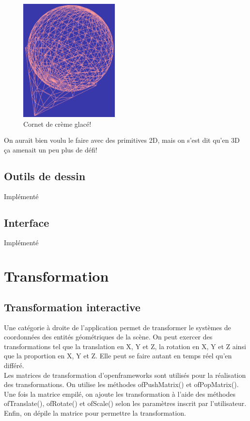 \begin{figure}[h]
	\centering
	\includegraphics[width=5cm]{fig/iceCream.png}
	\caption{Cornet de crème glacé!}
	\label{fig:iceCream}
\end{figure}

On aurait bien voulu le faire avec des primitives 2D, mais on s'est dit qu'en 3D ça amenait un peu plus de défi!

\subsection{Outils de dessin}
Implémenté

\subsection{Interface}
Implémenté

\pagebreak
\section{Transformation}
\subsection{Transformation interactive}
Une catégorie à droite de l’application permet de transformer le systèmes de coordonnées des entités géométriques de la scène. On peut exercer des transformations tel que la translation en X, Y et Z, la rotation en X, Y et Z ainsi que la proportion en X, Y et Z. Elle peut se faire autant en temps réel qu’en différé. \\

Les matrices de transformation d’openframeworks sont utilisés pour la réalisation des transformations. On utilise les méthodes ofPushMatrix() et ofPopMatrix(). Une fois la matrice empilé, on ajoute les transformation à l’aide des méthodes ofTranslate(), ofRotate() et ofScale() selon les paramètres inscrit par l’utilisateur. Enfin, on dépile la matrice pour permettre la transformation.\\

